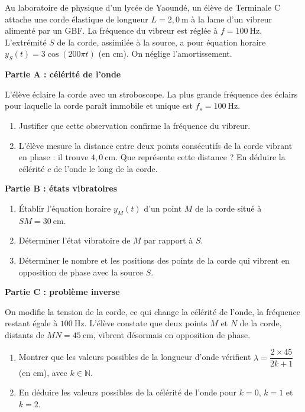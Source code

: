 \documentclass[11pt]{article}
\begin{document}
\begin{exercice}
Au laboratoire de physique d'un lycée de Yaoundé, un élève de Terminale C attache une corde élastique de longueur $L = 2{,}0\ \text{m}$ à la lame d'un vibreur alimenté par un GBF. La fréquence du vibreur est réglée à $f = 100\ \text{Hz}$. L'extrémité $S$ de la corde, assimilée à la source, a pour équation horaire $y_S(t) = 3\cos(200\pi t)$ (en cm). On néglige l'amortissement.

\textbf{Partie A : célérité de l'onde}

L'élève éclaire la corde avec un stroboscope. La plus grande fréquence des éclairs pour laquelle la corde paraît immobile et unique est $f_s = 100\ \text{Hz}$.
\begin{enumerate}
\item Justifier que cette observation confirme la fréquence du vibreur.
\item L'élève mesure la distance entre deux points consécutifs de la corde vibrant en phase : il trouve $4{,}0\ \text{cm}$. Que représente cette distance ? En déduire la célérité $c$ de l'onde le long de la corde.
\end{enumerate}

\textbf{Partie B : états vibratoires}
\begin{enumerate}[resume]
\item Établir l'équation horaire $y_M(t)$ d'un point $M$ de la corde situé à $SM = 30\ \text{cm}$.
\item Déterminer l'état vibratoire de $M$ par rapport à $S$.
\item Déterminer le nombre et les positions des points de la corde qui vibrent en opposition de phase avec la source $S$.
\end{enumerate}

\textbf{Partie C : problème inverse}

On modifie la tension de la corde, ce qui change la célérité de l'onde, la fréquence restant égale à $100\ \text{Hz}$. L'élève constate que deux points $M$ et $N$ de la corde, distants de $MN = 45\ \text{cm}$, vibrent désormais en opposition de phase.
\begin{enumerate}[resume]
\item Montrer que les valeurs possibles de la longueur d'onde vérifient $\lambda = \dfrac{2 \times 45}{2k+1}$ (en cm), avec $k \in \mathbb{N}$.
\item En déduire les valeurs possibles de la célérité de l'onde pour $k = 0$, $k = 1$ et $k = 2$.
\end{enumerate}
\end{exercice}
\end{document}
